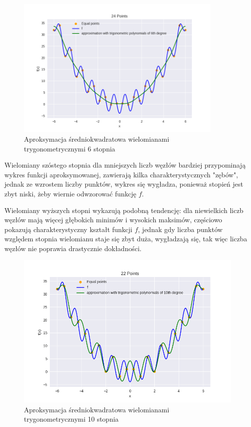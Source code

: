 \documentclass{article}
\begin{document}
\begin{figure}[H]
    \centering
    \includegraphics[width=0.9\textwidth]{img/tripoly_6_24.png}
    \caption{Aproksymacja średniokwadratowa wielomianami trygonometrycznymi 6 stopnia}
\end{figure}

Wielomiany szóstego stopnia dla mniejszych liczb węzłów bardziej przypominają wykres funkcji aproksymowanej, zawierają kilka
charakterystycznych "zębów", jednak ze wzrostem liczby punktów, wykres się wygładza, ponieważ stopień jest zbyt niski, żeby
wiernie odwzorować funkcję $f$.

Wielomiany wyższych stopni wykazują podobną tendencję: dla niewielkich liczb węzłów mają więcej głębokich minimów i wysokich maksimów,
częściowo pokazują charakterystyczny kształt funkcji $f$, jednak gdy liczba punktów względem stopnia wielomianu staje się zbyt duża,
wygładzają się, tak więc liczba węzłów nie poprawia drastycznie dokładności.

\begin{figure}[H]
    \centering
    \includegraphics[width=\textwidth]{img/tripoly_10_22.png}
    \caption{Aproksymacja średniokwadratowa wielomianami trygonometrycznymi 10 stopnia}
\end{figure}
\end{document}

